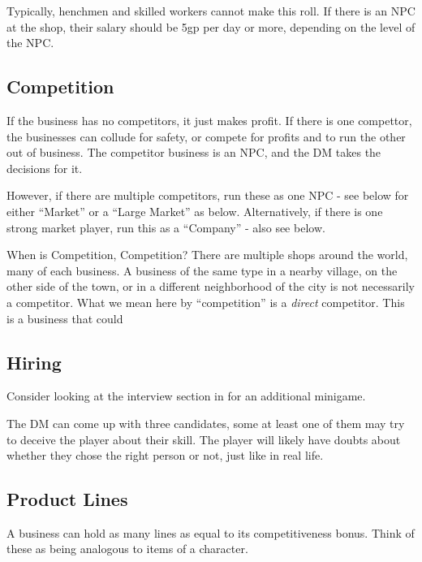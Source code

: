 \documentclass[twocolumn]{dndbook}
\begin{document}
Typically, henchmen and skilled workers cannot make this roll. If there is an NPC at the shop,
their salary should be 5gp per day or more, depending on the level of the NPC.

\subsection{Competition}
If the business has no competitors, it just makes profit.
If there is one compettor, the businesses can collude for safety, or compete for profits
and to run the other out of business. The competitor business is an NPC,
and the DM takes the decisions for it.\par

However, if there are multiple competitors, run these as one NPC - see below
for either ``Market'' or a ``Large Market'' as below.
Alternatively, if there is one strong
market player, run this as a ``Company'' - also see below.

\begin{DndSidebar}[float=!b]{When is Competition, Competition?}
	There are multiple shops around the world, many of each business.
	A business of the same type in a nearby village, on the other side of the town,
	or in a different neighborhood of the city is not necessarily a competitor.
	What we mean here by ``competition'' is a \emph{direct} competitor.
	This is a business that could
\end{DndSidebar}


\subsection{Hiring}

Consider looking at the interview section in 
for an additional minigame.\par

The DM can come up with three candidates, some at least one of them may try to deceive the player about their skill.
The player will likely have doubts about whether they chose the right person or not, just like in real life.\par

\subsection{Product Lines}

A business can hold as many lines as equal to its competitiveness bonus.
Think of these as being analogous to items of a character.\par
\end{document}
